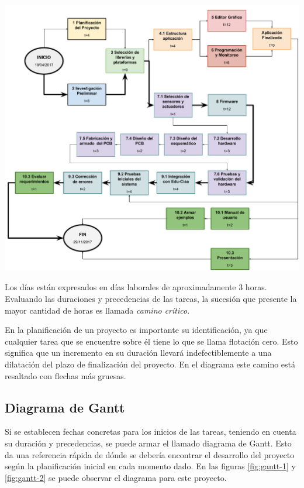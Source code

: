 \begin{center}
    \includegraphics[scale=.5]{./Figures/activity-on-node.pdf}
    \label{fig:activity-node}
\end{center}


Los días están expresados en días laborales de aproximadamente 3 horas. Evaluando las duraciones y precedencias de las tareas, la sucesión que presente la mayor cantidad de horas es llamada \emph{camino crítico}. 

En la planificación de un proyecto es importante su identificación, ya que cualquier tarea que se encuentre sobre él tiene lo que se llama flotación cero. Esto significa que un incremento en su duración llevará indefectiblemente a una dilatación del plazo de finalización del proyecto. En el diagrama este camino está resaltado con flechas más gruesas.

\subsection{Diagrama de Gantt}
Si se establecen fechas concretas para los inicios de las tareas, teniendo en cuenta su duración y precedencias, se puede armar el llamado diagrama de Gantt. Esto da una referencia rápida de dónde se debería encontrar el desarrollo del proyecto según la planificación inicial en cada momento dado. En las figuras \ref{fig:gantt-1} y \ref{fig:gantt-2} se puede observar el diagrama para este proyecto.

